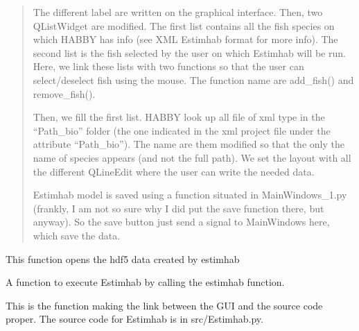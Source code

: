 \documentclass[letterpaper,10pt,english]{sphinxmanual}
\begin{document}
\begin{fulllineitems}
\begin{fulllineitems}
\begin{quote}
The different label are written on the graphical interface. Then, two QListWidget are modified. The first
list contains all the fish species on which HABBY has info (see XML Estimhab format for more info).
The second list is the fish selected by the user on which Estimhab will be run. Here, we link these lists
with two functions so that the user can select/deselect fish using the mouse. The function name are add\_fish()
and remove\_fish().

Then, we fill the first list. HABBY look up all file of xml type in the “Path\_bio” folder (the one indicated in
the xml project file under the attribute “Path\_bio”).  The name are them modified so that the only the name of
species appears (and not the full path). We set the layout with all the different QLineEdit where the user
can write the needed data.

Estimhab model is saved using a function situated in MainWindows\_1.py  (frankly, I am not so sure why I did put
the save function there, but anyway). So the save button just send a signal to MainWindows
here, which save the data.
\end{quote}

\end{fulllineitems}


\begin{fulllineitems}
\label{\detokenize{index:src_GUI.estimhab_GUI.EstimhabW.open_estimhab_hdf5}}
This function opens the hdf5 data created by estimhab

\end{fulllineitems}


\begin{fulllineitems}
\label{\detokenize{index:src_GUI.estimhab_GUI.EstimhabW.run_estmihab}}
A function to execute Estimhab by calling the estimhab function.


This is the function making the link between the GUI and the source code proper. The source code for Estimhab
is in src/Estimhab.py.


\end{fulllineitems}
\end{fulllineitems}
\end{document}
